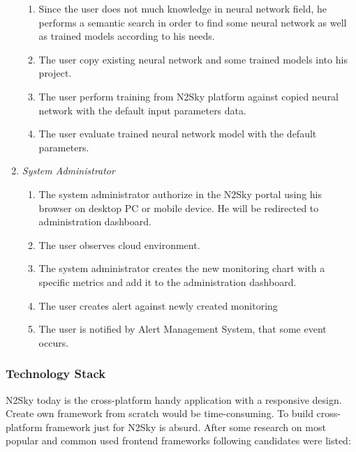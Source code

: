 \begin{enumerate}
\begin{enumerate}
\item Since the user does not much knowledge in neural network field, he performs a semantic search in order to find some neural network as well as trained models according to his needs.
\item The user copy existing neural network and some trained models into his project. 
\item The user perform training from N2Sky platform against copied neural network with the default input parameters data.
\item The user evaluate trained neural network model with the default parameters. 
\end{enumerate}
\item \emph{System Administrator}
\begin{enumerate}
\item The system administrator authorize in the N2Sky portal using his browser on desktop PC or mobile device. He will be redirected to administration dashboard.
\item The user observes cloud environment.
\item The system administrator creates the new monitoring chart with a specific metrics and add it to the administration dashboard.
\item The user creates alert against newly created monitoring
\item The user is notified by Alert Management System, that some event occurs.
\end{enumerate}
\end{enumerate}




 

\subsubsection{Technology Stack}\label{Technology Stack}

N2Sky today is the cross-platform handy application with a responsive design. Create own framework from scratch would be time-consuming. To build cross-platform framework just for N2Sky is absurd. After some research on most popular and common used frontend frameworks following candidates were listed: 

